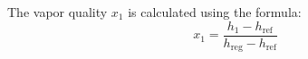 The vapor quality \( x_1 \) is calculated using the formula:  
\[
x_1 = \frac{h_1 - h_{\text{ref}}}{h_{\text{reg}} - h_{\text{ref}}}
\]